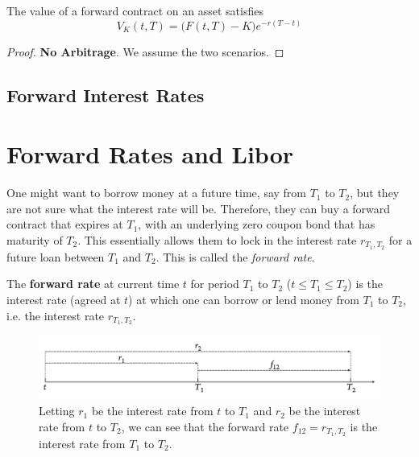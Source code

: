 \documentclass{article}
\begin{document}
    \begin{theorem}
      The value of a forward contract on an asset satisfies 
      \begin{equation}
        V_K (t, T) = \big( F(t, T) - K \big) e^{-r(T - t)}
      \end{equation}
    \end{theorem}
    \begin{proof}
      \textbf{No Arbitrage}. We assume the two scenarios.
    \end{proof}

  \subsection{Forward Interest Rates}

\section{Forward Rates and Libor}

  One might want to borrow money at a future time, say from $T_1$ to $T_2$, but they are not sure what the interest rate will be. Therefore, they can buy a forward contract that expires at $T_1$, with an underlying zero coupon bond that has maturity of $T_2$. This essentially allows them to lock in the interest rate $r_{T_1, T_2}$ for a future loan between $T_1$ and $T_2$. This is called the \textit{forward rate}. 

  \begin{definition}
    The \textbf{forward rate} at current time $t$ for period $T_1$ to $T_2$ ($t \leq T_1 \leq T_2$) is the interest rate (agreed at $t$) at which one can borrow or lend money from $T_1$ to $T_2$, i.e. the interest rate $r_{T_1, T_2}$. 

    \begin{figure}[H]
      \centering 
      \includegraphics[scale=0.35]{img/forward_zero_rates.png}
      \caption{Letting $r_1$ be the interest rate from $t$ to $T_1$ and $r_2$ be the interest rate from $t$ to $T_2$, we can see that the forward rate $f_{12} = r_{T_1, T_2}$ is the interest rate from $T_1$ to $T_2$.}
      \label{fig:forward_zero_rates}
    \end{figure}
  \end{definition}
\end{document}
